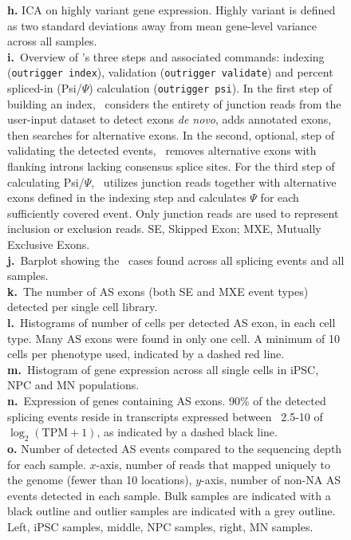 \begin{figure}[h]
{\textbf{h.} ICA on highly variant gene expression. Highly variant is defined as two standard deviations away from mean gene-level variance across all samples.\\
\textbf{i.}~Overview of \outrigger's three steps and associated commands: indexing (\texttt{outrigger index}), validation (\texttt{outrigger validate}) and percent spliced-in (Psi/$\Psi$) calculation (\texttt{outrigger psi}). In the first step of building an index, \outrigger\, considers the entirety of junction reads from the user-input dataset to detect exons \emph{de novo}, adds annotated exons, then searches for alternative exons. In the second, optional, step of validating the detected events, \outrigger\, removes alternative exons with flanking introns lacking consensus splice sites. For the third step of calculating Psi/$\Psi$, \outrigger\, utilizes junction reads together with alternative exons defined in the indexing step and calculates $\Psi$ for each sufficiently covered event. Only junction reads are used to represent inclusion or exclusion reads. SE, Skipped Exon; MXE, Mutually Exclusive Exons.\\
\textbf{j.}~Barplot showing the \outrigger\, cases found across all splicing events and all samples.\\
\textbf{k.}~The number of AS exons (both SE and MXE event types) detected per single cell library. \\
\textbf{l.}~Histograms of number of cells per detected AS exon, in each cell type. Many AS exons were found in only one cell. A minimum of 10 cells per phenotype used, indicated by a dashed red line.\\
\textbf{m.}~Histogram of gene expression across all single cells in iPSC, NPC and MN populations.\\
\textbf{n.}~Expression of genes containing AS exons. 90\% of the detected splicing events reside in transcripts expressed between ~2.5-10 of $\log_2(\mathrm{TPM}+1)$, as indicated by a dashed black line. \\
\textbf{o.} Number of detected AS events compared to the sequencing depth for each sample. $x$-axis, number of reads that mapped uniquely to the genome (fewer than 10 locations), $y$-axis, number of non-NA AS events detected in each sample. Bulk samples are indicated with a black outline and outlier samples are indicated with a grey outline. Left, iPSC samples, middle, NPC samples, right, MN samples.
}
\label{fig:quality_control}
\end{figure}





